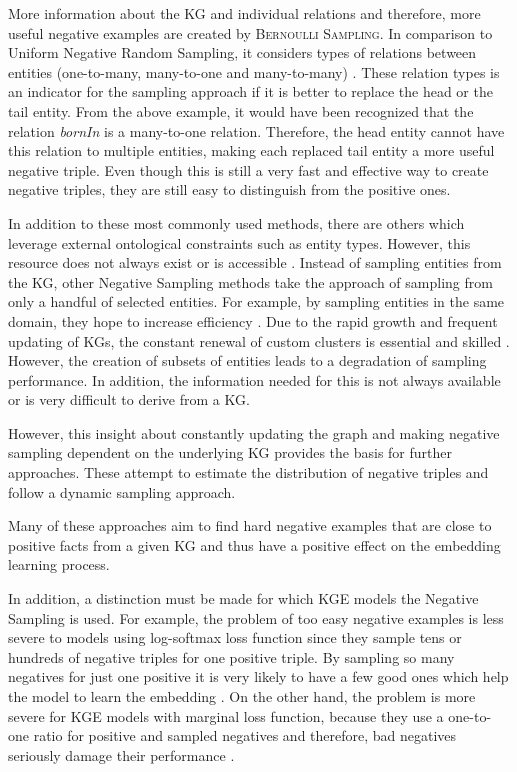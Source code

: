More information about the \ac{KG} and individual relations and therefore, more useful negative examples are created by \textsc{Bernoulli Sampling}.
In comparison to Uniform Negative Random Sampling, it considers types of relations between entities (one-to-many, many-to-one and many-to-many) \cite{zhang2021efficient}.
These relation types is an indicator for the sampling approach if it is better to replace the head or the tail entity.
From the above example, it would have been recognized that the relation \textit{bornIn} is a many-to-one relation.
Therefore, the head entity cannot have this relation to multiple entities, making each replaced tail entity a more useful negative triple.
Even though this is still a very fast and effective way to create negative triples, they are still easy to distinguish from the positive ones.

In addition to these most commonly used methods, there are others which leverage external ontological constraints such as entity types.
However, this resource does not always exist or is accessible \cite{cai2017kbgan}.
Instead of sampling entities from the \ac{KG}, other Negative Sampling methods take the approach of sampling from only a handful of selected entities.
For example, by sampling entities in the same domain, they hope to increase efficiency \cite{qiannegative}.
Due to the rapid growth and frequent updating of \acp{KG}, the constant renewal of custom clusters is essential and skilled \cite{qiannegative}. 
However, the creation of subsets of entities leads to a degradation of sampling performance.
In addition, the information needed for this is not always available or is very difficult to derive from a \ac{KG}.

However, this insight about constantly updating the graph and making negative sampling dependent on the underlying KG provides the basis for further approaches.
These attempt to estimate the distribution of negative triples and follow a dynamic sampling approach. 

Many of these approaches aim to find hard negative examples that are close to positive facts from a given \ac{KG} and thus have a positive effect on the embedding learning process.




In addition, a distinction must be made for which \ac{KGE} models the Negative Sampling is used.
For example, the problem of too easy negative examples is less severe to models using log-softmax loss function since they sample tens or hundreds of negative triples for one positive triple.
By sampling so many negatives for just one positive it is very likely to have a few good ones which help the model to learn the embedding \cite{cai2017kbgan}.
On the other hand, the problem is more severe for KGE models with marginal loss function, because they use a one-to-one ratio for positive and sampled negatives and therefore, bad negatives seriously damage their performance \cite{cai2017kbgan}.







